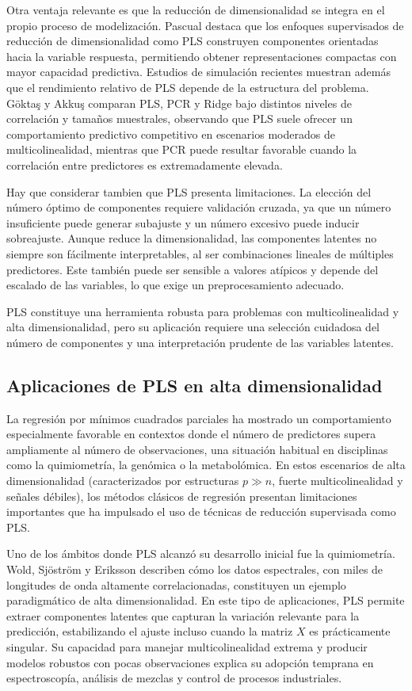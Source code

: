 \documentclass[12pt,a4paper]{report}
\begin{document}
Otra ventaja relevante es que la reducción de dimensionalidad se integra en el propio proceso de modelización. Pascual \cite{pascual2020} destaca que los enfoques supervisados de reducción de dimensionalidad como PLS construyen componentes orientadas hacia la variable respuesta, permitiendo obtener representaciones compactas con mayor capacidad predictiva. Estudios de simulación recientes muestran además que el rendimiento relativo de PLS depende de la estructura del problema. Göktaş y Akkuş \cite{goktas2020} comparan PLS, PCR y Ridge bajo distintos niveles de correlación y tamaños muestrales, observando que PLS suele ofrecer un comportamiento predictivo competitivo en escenarios moderados de multicolinealidad, mientras que PCR puede resultar favorable cuando la correlación entre predictores es extremadamente elevada.

Hay que considerar tambien que PLS presenta limitaciones. La elección del número óptimo de componentes requiere validación cruzada, ya que un número insuficiente puede generar subajuste y un número excesivo puede inducir sobreajuste. Aunque reduce la dimensionalidad, las componentes latentes no siempre son fácilmente interpretables, al ser combinaciones lineales de múltiples predictores. Este también puede ser sensible a valores atípicos y depende del escalado de las variables, lo que exige un preprocesamiento adecuado.

PLS constituye una herramienta robusta para problemas con multicolinealidad y alta dimensionalidad, pero su aplicación requiere una selección cuidadosa del número de componentes y una interpretación prudente de las variables latentes.

\subsection{Aplicaciones de PLS en alta dimensionalidad}

La regresión por mínimos cuadrados parciales ha mostrado un comportamiento especialmente favorable en contextos donde el número de predictores supera ampliamente al número de observaciones, una situación habitual en disciplinas como la quimiometría, la genómica o la metabolómica. En estos escenarios de alta dimensionalidad (caracterizados por estructuras \(p \gg n\), fuerte multicolinealidad y señales débiles), los métodos clásicos de regresión presentan limitaciones importantes que ha impulsado el uso de técnicas de reducción supervisada como PLS.

Uno de los ámbitos donde PLS alcanzó su desarrollo inicial fue la quimiometría. Wold, Sjöström y Eriksson \cite{wold2001} describen cómo los datos espectrales, con miles de longitudes de onda altamente correlacionadas, constituyen un ejemplo paradigmático de alta dimensionalidad. En este tipo de aplicaciones, PLS permite extraer componentes latentes que capturan la variación relevante para la predicción, estabilizando el ajuste incluso cuando la matriz \(X\) es prácticamente singular. Su capacidad para manejar multicolinealidad extrema y producir modelos robustos con pocas observaciones explica su adopción temprana en espectroscopía, análisis de mezclas y control de procesos industriales.
\end{document}
